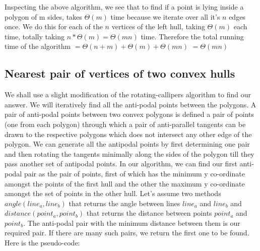 \documentclass{article}
\begin{document}
Inspecting the above algorithm, we see that to find if a point is lying inside a polygon of m sides, takes $\Theta (m)$ time because we iterate over all it's $n$ edges once. We do this for each of the $n$ vertices of the left hull, taking $\Theta (m)$ each time, totally taking $n*\Theta(m) = \Theta(mn)$ time.
\newline
Therefore the total running time of the algorithm $= \Theta(n+m) + \Theta(m) + \Theta(mn)$ \newline $= \Theta(mn)$

\newpage
\subsection{Nearest pair of vertices of two convex hulls}

We shall use a slight modification of the rotating-callipers algorithm to find our answer. We will iteratively find all the anti-podal points between the polygons. A pair of anti-podal points between two convex polygons is defined a pair of points (one from each polygon) through which a pair of anti-parallel tangents can be drawn to the respective polygons which does not intersect any other edge of the polygon. We can generate all the antipodal points by first determining one pair and then rotating the tangents minimally along the sides of the polygon till they pass another set of antipodal points. In our algorithm, we can find our first anti-podal pair as the pair of points, first of which has the minimum y co-ordinate amongst the points of the first hull and the other the maximum y co-ordinate amongst the set of points in the other hull. Let's assume two methods $angle(line_a, line_b)$ that returns the angle between lines $line_a$ and $line_b$ and $distance(point_a, point_b)$ that returns the distance between points $point_a$ and $point_b$. The anti-podal pair with the minimum distance between them is our required pair. If there are many such pairs, we return the first one to be found.
\newline 
Here is the pseudo-code:
\newline
\end{document}
